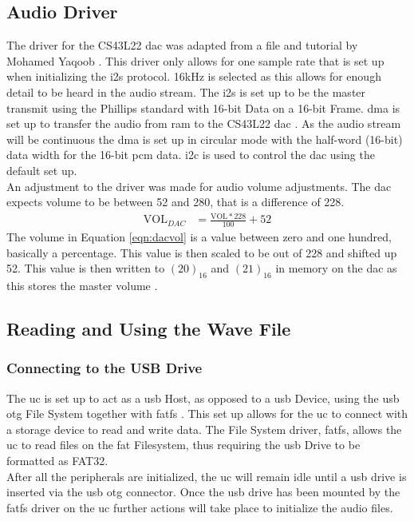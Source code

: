 \documentclass[12pt,a4paper]{report}
\begin{document}
\subsection{Audio Driver}
The driver for the CS43L22 \ac{dac} \cite{dac} was adapted from a file and tutorial by Mohamed Yaqoob \cite{audDrive}. This driver only allows for one sample rate that is set up when initializing the \ac{i2s} protocol. 16kHz is selected as this allows for enough detail to be heard in the audio stream. The \ac{i2s} is set up to be the master transmit using the Phillips standard with 16-bit Data on a 16-bit Frame. \ac{dma} is set up to transfer the audio from \ac{ram} to the CS43L22 \ac{dac} \cite{dac}. As the audio stream will be continuous the \ac{dma} is set up in circular mode with the half-word (16-bit) data width for the 16-bit \ac{pcm} data. \ac{i2c} is used to control the \ac{dac} using the default set up.\\
An adjustment to the driver was made for audio volume adjustments. The \ac{dac} expects volume to be between 52 and 280, that is a difference of 228. 
\begin{equation}
	\begin{aligned}
	\text{VOL}_{DAC} &= \frac{\text{VOL} * 228}{100} + 52
	\end{aligned}
	\label{eqn:dacvol}
\end{equation}
The volume in Equation \ref{eqn:dacvol} is a value between zero and one hundred, basically a percentage. This value is then scaled to be out of 228 and shifted up 52. This value is then written to $(20)_{16}$ and $(21)_{16}$ in memory on the \ac{dac} as this stores the master volume \cite{dac}.
\subsection{Reading and Using the Wave File} \label{sec:readuseWave}
\subsubsection{Connecting to the USB Drive}
The \ac{uc} is set up to act as a \ac{usb} Host, as opposed to a \ac{usb} Device, using the \ac{usb} \ac{otg} File System together with \ac{fatfs} \cite{fatfs}. This set up allows for the \ac{uc} to connect with a storage device to read and write data. The File System driver, \ac{fatfs}, allows the \ac{uc} to read files on the \ac{fat} Filesystem, thus requiring the \ac{usb} Drive to be formatted as FAT32.\\
After all the peripherals are initialized, the \ac{uc} will remain idle until a \ac{usb} drive is inserted via the \ac{usb} \ac{otg} connector. Once the \ac{usb} drive has been mounted by the \ac{fatfs} driver on the \ac{uc} further actions will take place to initialize the audio files.
\end{document}
